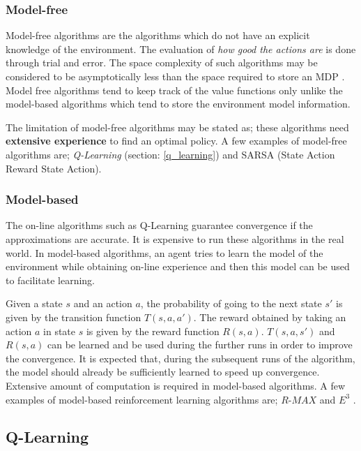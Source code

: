 \documentclass[12pt]{report}
\begin{document}
\subsubsection{Model-free}
Model-free algorithms are the algorithms which do not have an explicit knowledge of the environment. The evaluation of \textit{how good the actions are} is done through trial and error. The space complexity of such algorithms may be considered to be asymptotically less than the space required to store an MDP \cite{strehl2006pac}. Model free algorithms tend to keep track of the value functions only unlike the model-based algorithms which tend to store the environment model information.\par The limitation of model-free algorithms may be stated as; these algorithms need \textbf{extensive experience} to find an optimal policy. A few examples of model-free algorithms are; \textit{Q-Learning} (section: \ref{q_learning}) and SARSA (State Action Reward State Action).

\subsubsection{Model-based}
The on-line algorithms such as Q-Learning guarantee convergence if the approximations are accurate. It is expensive to run these algorithms in the real world. In model-based algorithms, an agent tries to learn the model of the environment while obtaining on-line experience and then this model can be used to facilitate learning. \par 
Given a state $s$ and an action $a$, the probability of going to the next state $s'$ is given by the transition function $T(s,a,a')$. The reward obtained by taking an action $a$ in state $s$ is given by the reward function $R(s,a)$. $T(s,a,s')$ and $R(s,a)$ can be learned and be used during the further runs in order to improve the convergence. It is expected that, during the subsequent runs of the algorithm, the model should already be sufficiently learned to speed up convergence. Extensive amount of computation is required in model-based algorithms. A few examples of model-based reinforcement learning algorithms are;  $R$-$MAX$ \cite{brafman2002r} and $E^3$ \cite{kearns2002near}.

\subsection{Q-Learning}
\end{document}
